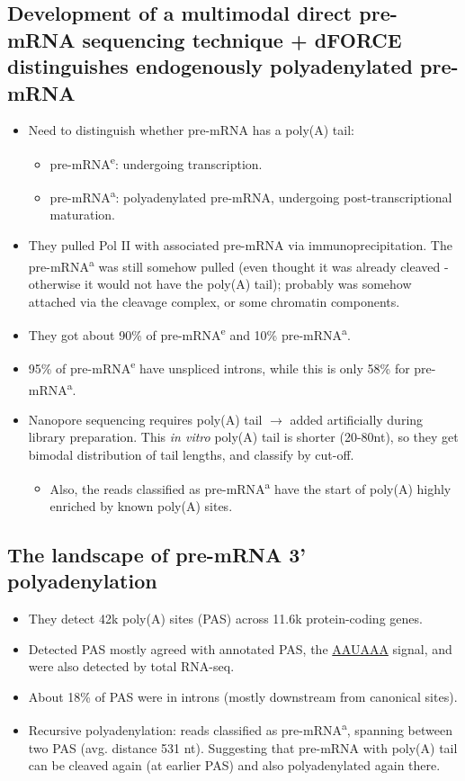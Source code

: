 \documentclass{article}
\begin{document}
	\subsection{Development of a multimodal direct pre-mRNA sequencing technique + dFORCE distinguishes endogenously polyadenylated pre-mRNA}
	\begin{itemize}
		\item Need to distinguish whether pre-mRNA has a poly(A) tail:
		\begin{itemize}
			\item pre-mRNA\textsuperscript{e}: undergoing transcription.
			\item pre-mRNA\textsuperscript{a}: polyadenylated pre-mRNA, undergoing post-transcriptional maturation.
		\end{itemize}
		\item They pulled Pol II with associated pre-mRNA via immunoprecipitation. The pre-mRNA\textsuperscript{a} was still somehow pulled (even thought it was already cleaved - otherwise it would not have the poly(A) tail); probably was somehow attached via the cleavage complex, or some chromatin components.
		\item They got about 90\% of pre-mRNA\textsuperscript{e} and 10\% pre-mRNA\textsuperscript{a}.  
		\item 95\% of pre-mRNA\textsuperscript{e} have unspliced introns, while this is only 58\% for  pre-mRNA\textsuperscript{a}.
		\item Nanopore sequencing requires poly(A) tail $\to$ added artificially during library preparation. This \textit{in vitro} poly(A) tail is shorter (20-80nt), so they get bimodal distribution of tail lengths, and classify by cut-off.
		\begin{itemize}
			\item Also, the reads classified as pre-mRNA\textsuperscript{a} have the start of poly(A) highly enriched by known poly(A) sites.			
		\end{itemize}		
	\end{itemize}
	
	\subsection{The landscape of pre-mRNA 3' polyadenylation}
	\begin{itemize}
		\item They detect 42k poly(A) sites (PAS) across 11.6k protein-coding genes.
		\item Detected PAS mostly agreed with annotated PAS, the \underline{AAUAAA} signal, and were also detected by total RNA-seq.
		\item About 18\% of PAS were in introns (mostly downstream from canonical sites).
		\item Recursive polyadenylation: reads classified as pre-mRNA\textsuperscript{a}, spanning between two PAS (avg. distance 531 nt). Suggesting that pre-mRNA with poly(A) tail can be cleaved again (at earlier PAS) and also polyadenylated again there.
	\end{itemize}
	
\end{document}
